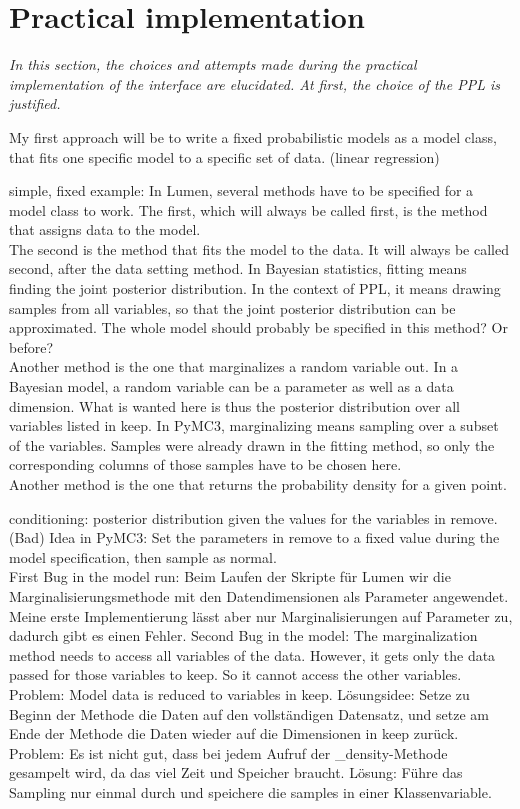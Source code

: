 \documentclass{article}
\begin{document}
\section{Practical implementation}

\textit{In this section, the choices and attempts made during the practical implementation of the interface are elucidated. At first, the choice of the PPL is justified.}

My first approach will be to write a fixed probabilistic models as a model class, that fits one specific model to a specific set of data. (linear regression)


simple, fixed example:
In Lumen, several methods have to be specified for a model class to work. The first, which will always be called first, is the method that assigns data to the model.
\\
The second is the method that fits the model to the data. It will always be called second, after the data setting method. In Bayesian statistics, fitting means finding the joint posterior distribution. In the context of PPL, it means drawing samples from all variables, so that the joint posterior distribution can be approximated. The whole model should probably be specified in this method? Or before?
\\
Another method is the one that marginalizes a random variable out. In a Bayesian model, a random variable can be a parameter as well as a data dimension.  What is wanted here is thus the posterior distribution over all variables listed in keep.
In PyMC3, marginalizing means sampling over a subset of the variables. Samples were already drawn in the fitting method, so only the corresponding columns of those samples have to be chosen here.
\\
Another method is the one that returns the probability density for a given point.


conditioning: posterior distribution given the values for the variables in remove. (Bad) Idea in PyMC3: Set the parameters in remove to a fixed value during the model specification, then sample as normal.
\\
First Bug in the model run: Beim Laufen der Skripte für Lumen wir die Marginalisierungsmethode mit den Datendimensionen als Parameter angewendet. Meine erste Implementierung lässt aber nur Marginalisierungen auf Parameter zu, dadurch gibt es einen Fehler.
Second Bug in the model: The marginalization method needs to access all variables of the data. However, it gets only the data passed for those variables to keep. So it cannot access the other variables. 
Problem: Model data is reduced to variables in keep. Lösungsidee: Setze zu Beginn der Methode die Daten auf den vollständigen Datensatz, und setze am Ende der Methode die Daten wieder auf die Dimensionen in keep zurück.
\\
Problem: Es ist nicht gut, dass bei jedem Aufruf der \_density-Methode gesampelt wird, da das viel Zeit und Speicher braucht. Lösung: Führe das Sampling nur einmal durch und speichere die samples in einer Klassenvariable.
\end{document}
